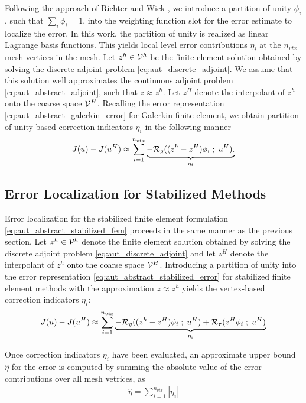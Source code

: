 Following the approach of Richter and Wick
\cite{richter2015variational}, we introduce a partition of unity $\phi_i$, such that
$\sum_i \phi_i = 1$, into the weighting function slot for the
error estimate to localize the error. In this work, the partition of unity is
realized as linear Lagrange basis functions. This yields
local level error contributions $\eta_i$ at the $n_{vtx}$ mesh
vertices in the mesh.  Let $z^h \in \mathcal{V}^h$ be the finite element
solution obtained by solving the discrete adjoint problem
\eqref{eq:aut_discrete_adjoint}. We assume that this solution
well approximates the continuous adjoint problem \eqref{eq:aut_abstract_adjoint},
such that $z \approx z^h$. Let $z^H$ denote the interpolant of $z^h$
onto the coarse space $\mathcal{V}^H$. Recalling the error representation
\eqref{eq:aut_abstract_galerkin_error} for Galerkin finite element,
we obtain partition of unity-based correction indicators $\eta_i$ in the following
manner
%
\begin{gather}
J(u) - J(u^H) \approx
\sum_{i=1}^{n_{vtx}}
\underbrace{
- \mathcal{R}_g( (z^h - z^H) \phi_i \; ; \; u^H).
}_{\eta_i}
\label{eq:aut_galerkin_localization}
\end{gather}

\subsection{Error Localization for Stabilized Methods}

Error localization for the stabilized finite element formulation
\eqref{eq:aut_abstract_stabilized_fem} proceeds in the same manner as the
previous section. Let $z^h \in \mathcal{V}^h$ denote the finite element solution
obtained by solving the discrete adjoint problem
\eqref{eq:aut_discrete_adjoint} and let $z^H$ denote the interpolant
of $z^h$ onto the coarse space $\mathcal{V}^H$. Introducing a partition of unity into the
error representation \eqref{eq:aut_abstract_stabilized_error} for stabilized
finite element methods with the approximation $z \approx z^h$ yields
the vertex-based correction indicators $\eta_i$:
%
\begin{gather}
J(u) - J(u^H) \approx
\sum_{i=1}^{n_{vtx}}
\underbrace{
- \mathcal{R}_g( (z^h - z^H) \phi_i \; ; \; u^H) +
\mathcal{R}_{\tau}( z^H \phi_i \; ; \; u^H)
}_{\eta_i}
\label{eq:aut_stabilized_localization}
\end{gather}

Once correction indicators $\eta_i$ have been evaluated, an approximate
upper bound $\hat{\eta}$ for the error is computed by summing the absolute
value of the error contributions over all mesh vetrices, as
%
\begin{gather}
\hat{\eta} = \sum_{i=1}^{n_{vtx}} | \eta_i |
\label{eq:aut_upper_bound}
\end{gather}

